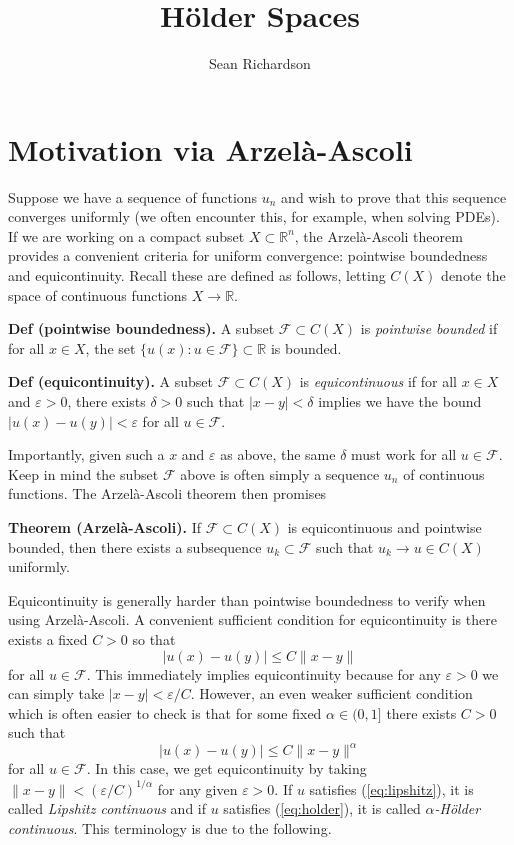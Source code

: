 \documentclass[
]{article}
\title{Hölder Spaces}
\author{Sean Richardson}
\date{}
\begin{document}
\maketitle

\hypertarget{motivation-via-arzeluxe0-ascoli}{%
\section{Motivation via
Arzelà-Ascoli}\label{motivation-via-arzeluxe0-ascoli}}

Suppose we have a sequence of functions \(u_n\) and wish to prove that
this sequence converges uniformly (we often encounter this, for example,
when solving PDEs). If we are working on a compact subset
\(X \subset \mathbb{R}^n\), the Arzelà-Ascoli theorem provides a
convenient criteria for uniform convergence: pointwise boundedness and
equicontinuity. Recall these are defined as follows, letting \(C(X)\)
denote the space of continuous functions \(X \to \mathbb{R}\).

\textbf{Def (pointwise boundedness).} A subset
\(\mathcal{F} \subset C(X)\) is \emph{pointwise bounded} if for all
\(x \in X\), the set \(\{u(x): u \in \mathcal{F}\} \subset \mathbb{R}\)
is bounded.

\textbf{Def (equicontinuity).} A subset \(\mathcal{F} \subset C(X)\) is
\emph{equicontinuous} if for all \(x \in X\) and \(\varepsilon > 0\),
there exists \(\delta > 0\) such that \(|x-y| < \delta\) implies we have
the bound \(|u(x) - u(y)| < \varepsilon\) for all \(u \in \mathcal{F}\).

Importantly, given such a \(x\) and \(\varepsilon\) as above, the same
\(\delta\) must work for all \(u \in \mathcal{F}\). Keep in mind the
subset \(\mathcal{F}\) above is often simply a sequence \(u_n\) of
continuous functions. The Arzelà-Ascoli theorem then promises

\textbf{Theorem (Arzelà-Ascoli).} If \(\mathcal{F} \subset C(X)\) is
equicontinuous and pointwise bounded, then there exists a subsequence
\(u_k \subset \mathcal{F}\) such that \(u_k \to u \in C(X)\) uniformly.

Equicontinuity is generally harder than pointwise boundedness to verify
when using Arzelà-Ascoli. A convenient sufficient condition for
equicontinuity is there exists a fixed \(C > 0\) so that \[
    |u(x) - u(y)| \leq C \|x-y\| \tag{1} \label{eq:lipshitz}
\] for all \(u \in \mathcal{F}\). This immediately implies
equicontinuity because for any \(\varepsilon > 0\) we can simply take
\(|x-y| < \varepsilon/C\). However, an even weaker sufficient condition
which is often easier to check is that for some fixed
\(\alpha \in (0,1]\) there exists \(C > 0\) such that \[
    |u(x) - u(y)| \leq C \|x-y\|^{\alpha} \tag{2} \label{eq:holder}
\] for all \(u \in \mathcal{F}\). In this case, we get equicontinuity by
taking \(\|x-y\| < (\varepsilon/C)^{1/\alpha}\) for any given
\(\varepsilon > 0\). If \(u\) satisfies (\ref{eq:lipshitz}), it is
called \emph{Lipshitz continuous} and if \(u\) satisfies
(\ref{eq:holder}), it is called \emph{\(\alpha\)-Hölder continuous}.
This terminology is due to the following.
\end{document}
